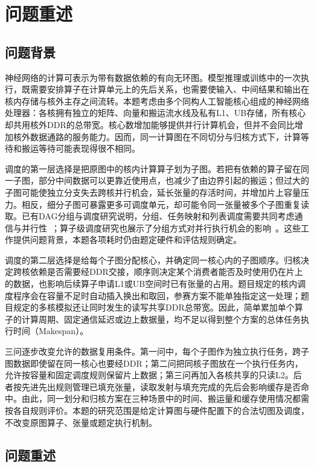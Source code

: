 \section{问题重述}
\subsection{问题背景}

神经网络的计算可表示为带有数据依赖的有向无环图。模型推理或训练中的一次执行，既需要安排算子在计算单元上的先后关系，也需要使输入、中间结果和输出在核内存储与核外主存之间流转。本题考虑由多个同构人工智能核心组成的神经网络处理器：各核拥有独立的矩阵、向量和搬运流水线及私有L1、UB存储，所有核心却共用核外DDR的总带宽。核心数增加能够提供并行计算机会，但并不会同比增加核外数据通路的服务能力。因而，同一计算图在不同切分与归核方式下，计算等待和搬运等待可能表现得很不相同。

调度的第一层选择是把原图中的核内计算算子划为子图。若把有依赖的算子留在同一子图，部分中间数据可以更靠近使用点，也减少了由边界引起的搬运；但过大的子图可能使独立分支失去跨核并行机会，延长张量的存活时间，并增加片上容量压力。相反，细分子图可暴露更多可调度单元，却可能令同一张量被多个子图重复读取。已有DAG分组与调度研究说明，分组、任务映射和列表调度需要共同考虑通信与并行性~\cite{A49}；算子级调度研究也展示了分组方式对并行执行机会的影响~\cite{A08}。这些工作提供问题背景，本题各项耗时仍由题定硬件和评估规则确定。

调度的第二层选择是给每个子图分配核心，并确定同一核心内的子图顺序。归核决定跨核依赖是否需要经DDR交接，顺序则决定某个消费者能否及时使用仍在片上的数据，也影响后续算子申请L1或UB空间时已有张量的占用。题目规定的核内调度程序会在容量不足时自动插入换出和取回，参赛方案不能单独指定这一处理；题目规定的多核模拟还让同时发生的读写共享DDR总带宽。因此，简单累加单个算子的计算周期、固定通信延迟或边上数据量，均不足以得到整个方案的总体任务执行时间（Makespan）。

三问逐步改变允许的数据复用条件。第一问中，每个子图作为独立执行任务，跨子图数据即使留在同一核心也要经DDR；第二问把同核子图放在一个执行任务内，允许按容量和固定调度规则保留片上数据；第三问再加入各核共享的只读L2。后者按先进先出规则管理已填充张量，读取发射与填充完成的先后会影响缓存是否命中。由此，同一划分和归核方案在三种场景中的时间、搬运量和缓存使用情况都需按各自规则评价。本题的研究范围是给定计算图与硬件配置下的合法切图及调度，不改变原图算子、张量或题定执行机制。

\subsection{问题重述}


